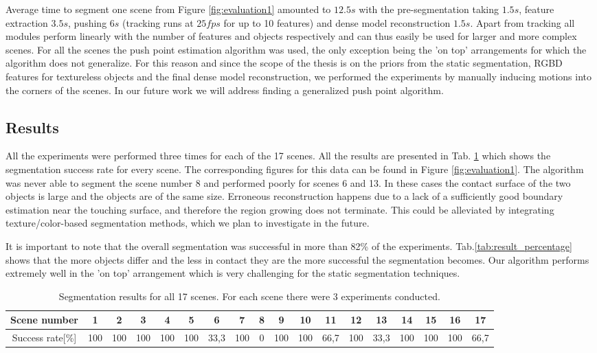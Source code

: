 Average time to segment one scene from Figure \ref{fig:evaluation1} amounted to $12.5s$ 
with the pre-segmentation taking $1.5s$, feature extraction $3.5s$, pushing 
$6s$ (tracking runs at $25fps$ for up to 10 features) and dense model reconstruction $1.5s$.
Apart from tracking all modules perform linearly with the
number of  features and objects  respectively and can thus  easily be
used for larger and more complex  scenes. For all the scenes the push
point estimation algorithm was used, the only exception being the 'on
top'  arrangements for which the algorithm does not generalize. 
For this reason and since the scope of the thesis is on the priors from
the static segmentation, RGBD features for
textureless objects and the final dense model reconstruction, we performed
the experiments by manually inducing motions into the corners of the scenes.
In  our  future work we  will address  finding a generalized  push point algorithm.
\vspace{-0.5ex}
\subsection{Results}
All  the  experiments were  performed  three  times  for each  of  the
17    scenes.    All    the    results   are    presented    in Tab.
\ref{tab:chart_result} which  shows the segmentation success rate  for every scene. 
The  corresponding figures for this data  can be found in  Figure \ref{fig:evaluation1}. 
The algorithm was never able to segment the scene number 8 and performed poorly for scenes
6 and 13. In these cases the contact surface of the two objects is large and the objects are of the same size.
Erroneous reconstruction happens due to a lack of a sufficiently good boundary estimation
near the touching surface, and therefore the region growing does not terminate.
This could be alleviated by integrating texture/color-based segmentation methods,
which we plan to investigate in the future.

It  is  important to  note  that  the  overall
segmentation   was    successful   in   more   than    82\%   of   the
experiments.  Tab.\ref{tab:result_percentage}  shows that the more
objects differ  and the less in  contact they are  the more successful
the  segmentation becomes.  Our
algorithm  performs extremely well in the  'on top'  arrangement which  is very
challenging for the static segmentation techniques.

\begin{table}[h!]\scriptsize
\centering 
\begin{tabular}{|c|c| c| c| c| c| c|c|c|c|c|c|c|c|c|c|c|c|}
\hline    Scene   number    &1   &    2    &   3    &4   &5&6&7&    8&
9&10&11&12&13&14&15&16&17\\ \hline  Success rate[\%] & 100  & 100 &100
&100&100&33,3  & 100  &  0  & 100&  100&  66,7& 100&33,3  &100&100&100
&66,7\\\hline
\end{tabular}
\caption{Segmentation results for  all 17 scenes.  For each scene there  were 3 experiments conducted.}
      \label{tab:chart_result}
\end{table}

